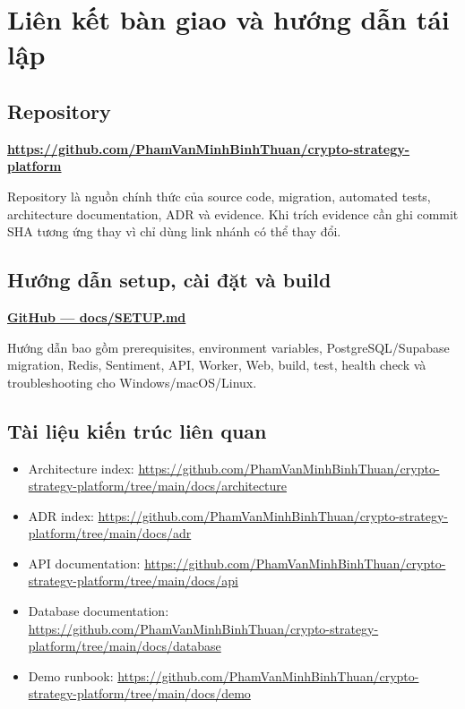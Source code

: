 \documentclass[12pt,a4paper,oneside]{report}
\begin{document}
\chapter{Liên kết bàn giao và hướng dẫn tái lập}
\label{app:links}

\section{Repository}

\begin{center}
\href{https://github.com/PhamVanMinhBinhThuan/crypto-strategy-platform}{%
\textbf{https://github.com/PhamVanMinhBinhThuan/crypto-strategy-platform}}
\end{center}

Repository là nguồn chính thức của source code, migration, automated tests, architecture documentation, ADR và evidence. Khi trích evidence cần ghi commit SHA tương ứng thay vì chỉ dùng link nhánh có thể thay đổi.

\section{Hướng dẫn setup, cài đặt và build}

\begin{center}
\href{https://github.com/PhamVanMinhBinhThuan/crypto-strategy-platform/blob/main/docs/SETUP.md}{%
\textbf{GitHub — docs/SETUP.md}}
\end{center}

Hướng dẫn bao gồm prerequisites, environment variables, PostgreSQL/Supabase migration, Redis, Sentiment, API, Worker, Web, build, test, health check và troubleshooting cho Windows/macOS/Linux.

\section{Tài liệu kiến trúc liên quan}

\begin{itemize}
  \item Architecture index: \url{https://github.com/PhamVanMinhBinhThuan/crypto-strategy-platform/tree/main/docs/architecture}
  \item ADR index: \url{https://github.com/PhamVanMinhBinhThuan/crypto-strategy-platform/tree/main/docs/adr}
  \item API documentation: \url{https://github.com/PhamVanMinhBinhThuan/crypto-strategy-platform/tree/main/docs/api}
  \item Database documentation: \url{https://github.com/PhamVanMinhBinhThuan/crypto-strategy-platform/tree/main/docs/database}
  \item Demo runbook: \url{https://github.com/PhamVanMinhBinhThuan/crypto-strategy-platform/tree/main/docs/demo}
\end{itemize}
\end{document}

